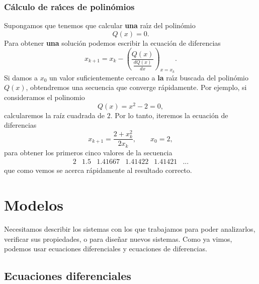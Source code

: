 \subsubsection{C\'{a}lculo de ra\'{\i}ces de polin\'{o}mios}
Supongamos que tenemos que calcular \textbf{una} ra\'{\i}z del
polin\'{o}mio
\begin{equation}
  Q(x) = 0.
\end{equation}
Para obtener \textbf{una} soluci\'{o}n podemos escribir la ecuaci\'{o}n de
diferencias
\begin{equation}
  x_{k+1} = x_{k} - \left(\frac{Q(x)}{\frac{d Q(x)}{dx}}\right)_{x=x_{k}}.
\end{equation}
Si damos a $x_{0}$ un valor suficientemente cercano a \textbf{la}
ra\'{\i}z buscada del polin\'{o}mio $Q(x)$, obtendremos una secuencia
que converge r\'{a}pidamente. Por ejemplo, si consideramos el polinomio
\begin{equation}
Q(x) = x^{2} - 2 = 0, 
\end{equation}
calcularemos la raíz cuadrada de $2$. Por lo tanto, iteremos la ecuaci\'{o}n de diferencias
\begin{equation}
  x_{k+1} = \frac{2 + x^{2}_{k}}{2 x_{k}}, \qquad x_{0}   = 2,
\end{equation}
para obtener los primeros cinco valores de la secuencia
\begin{equation}
  \begin{array}{llllll}
    2 & 1.5 & 1.41667 & 1.41422 & 1.41421 & ...
  \end{array}
\end{equation}
que como vemos se acerca r\'{a}pidamente al resultado correcto.

\section{Modelos}

Necesitamos describir los sistemas con los que trabajamos para poder
analizarlos, verificar sus propiedades, o para dise\~{n}ar nuevos
sistemas. Como ya vimos, podemos usar ecuaciones diferenciales y
ecuaciones de diferencias.

\subsection{Ecuaciones diferenciales}

